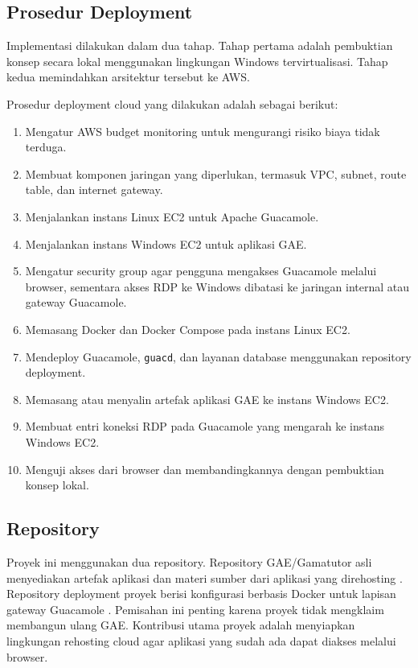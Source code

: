 \documentclass[conference]{IEEEtran}
\begin{document}
\subsection{Prosedur Deployment}

Implementasi dilakukan dalam dua tahap. Tahap pertama adalah pembuktian konsep secara lokal menggunakan lingkungan Windows tervirtualisasi. Tahap kedua memindahkan arsitektur tersebut ke AWS.

Prosedur deployment cloud yang dilakukan adalah sebagai berikut:

\begin{enumerate}
    \item Mengatur AWS budget monitoring untuk mengurangi risiko biaya tidak terduga.
    \item Membuat komponen jaringan yang diperlukan, termasuk VPC, subnet, route table, dan internet gateway.
    \item Menjalankan instans Linux EC2 untuk Apache Guacamole.
    \item Menjalankan instans Windows EC2 untuk aplikasi GAE.
    \item Mengatur security group agar pengguna mengakses Guacamole melalui browser, sementara akses RDP ke Windows dibatasi ke jaringan internal atau gateway Guacamole.
    \item Memasang Docker dan Docker Compose pada instans Linux EC2.
    \item Mendeploy Guacamole, \texttt{guacd}, dan layanan database menggunakan repository deployment.
    \item Memasang atau menyalin artefak aplikasi GAE ke instans Windows EC2.
    \item Membuat entri koneksi RDP pada Guacamole yang mengarah ke instans Windows EC2.
    \item Menguji akses dari browser dan membandingkannya dengan pembuktian konsep lokal.
\end{enumerate}

\subsection{Repository}

Proyek ini menggunakan dua repository. Repository GAE/Gamatutor asli menyediakan artefak aplikasi dan materi sumber dari aplikasi yang direhosting \cite{gamatutor}. Repository deployment proyek berisi konfigurasi berbasis Docker untuk lapisan gateway Guacamole \cite{deployment-repo}. Pemisahan ini penting karena proyek tidak mengklaim membangun ulang GAE. Kontribusi utama proyek adalah menyiapkan lingkungan rehosting cloud agar aplikasi yang sudah ada dapat diakses melalui browser.
\end{document}
